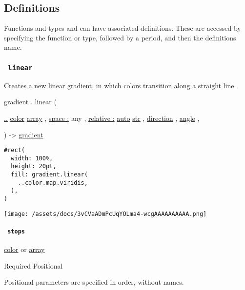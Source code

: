 \subsection{\texorpdfstring{{ Definitions
}}{ Definitions }}\label{definitions}

\label{definitions-tooltip}
Functions and types and can have associated definitions. These are
accessed by specifying the function or type, followed by a period, and
then the definition\textquotesingle s name.

\subsubsection{\texorpdfstring{\texttt{\ linear\ }}{ linear }}\label{definitions-linear}

Creates a new linear gradient, in which colors transition along a
straight line.

gradient { . } { linear } (

{ \hyperref[definitions-linear-parameters-stops]{..}
\href{/docs/reference/visualize/color/}{color}
\href{/docs/reference/foundations/array/}{array} , } {
\hyperref[definitions-linear-parameters-space]{space :} { any } , } {
\hyperref[definitions-linear-parameters-relative]{relative :}
\href{/docs/reference/foundations/auto/}{auto}
\href{/docs/reference/foundations/str/}{str} , } {
\href{/docs/reference/layout/direction/}{direction} , } {
\href{/docs/reference/layout/angle/}{angle} , }

) -\textgreater{} \href{/docs/reference/visualize/gradient/}{gradient}

\begin{verbatim}
#rect(
  width: 100%,
  height: 20pt,
  fill: gradient.linear(
    ..color.map.viridis,
  ),
)
\end{verbatim}

\texttt{[image: /assets/docs/3vCVaADmPcUqYOLma4-wcgAAAAAAAAAA.png]}

\paragraph{\texorpdfstring{\texttt{\ stops\ }}{ stops }}\label{definitions-linear-stops}

\href{/docs/reference/visualize/color/}{color} {or}
\href{/docs/reference/foundations/array/}{array}

{Required} {{ Positional }}

\label{definitions-linear-stops-positional-tooltip}
Positional parameters are specified in order, without names.

